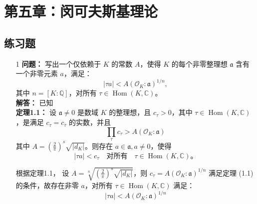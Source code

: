 \documentclass[UTF8]{ctexart}
\begin{document}
\begin{enumerate}
\begin{enumerate}
\end{enumerate}

\section{第五章：闵可夫斯基理论}

\subsection{练习题}

\begin{enumerate}

\item[1] 
\textbf{问题：} 写出一个仅依赖于 \(K\) 的常数 \(A\)，使得 \(K\) 的每个非零整理想 \(\mathfrak{a}\) 含有一个非零元素 \(a\)，满足：
\[
|\tau a| < A (\mathcal{O}_K : \mathfrak{a})^{1/n},
\]
其中 \(n = [K : \mathbb{Q}]\)，对所有 \(\tau \in \operatorname{Hom}(K, \mathbb{C})\)。\\

\textbf{解答：} 已知\\
\textbf{定理1.1：} 设 $\mathfrak{a} \neq 0$ 是数域 $K$ 的整理想，且 $c_\tau>0$，其中 $\tau \in \operatorname{Hom}(K, \mathbb{C})$，是满足 $c_\tau=c_{\bar{\tau}}$ 的实数，并且
$$
\prod_\tau c_{\mathfrak{\tau}}>A\left(\mathcal{O}_K: \mathfrak{a}\right)
$$
其中 $A=\left(\frac{2}{\pi}\right)^s \sqrt{\left|d_K\right|}$。则存在 $a \in \mathfrak{a}, a \neq 0$，使得
$$
|\tau a|<c_\tau \quad \text{对所有} \quad \tau \in \operatorname{Hom}(K, \mathbb{C})。
$$

根据定理1.1，
设 \(A = \sqrt[n]{(\frac{2}{\pi})^s \sqrt{|d_K|}}\)，则 \(c_\tau = A (\mathcal{O}_K : \mathfrak{a})^{1/n}\) 满足定理 (1.1) 的条件，故存在非零 \(a\)，对所有 \(\tau \in \operatorname{Hom}(K, \mathbb{C})\) 满足：
\[
|\tau a| < A (\mathcal{O}_K : \mathfrak{a})^{1/n}
\]


\end{enumerate}
\end{enumerate}
\end{document}

